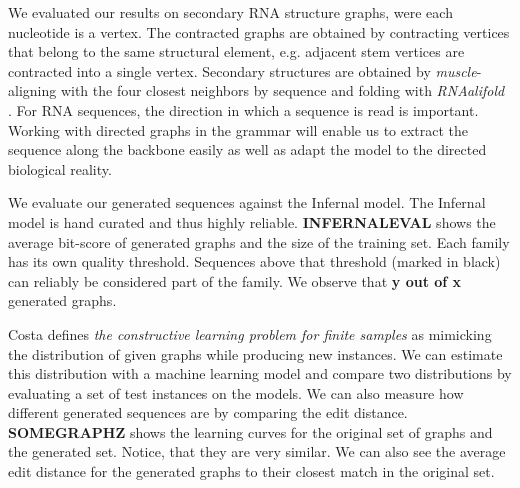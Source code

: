 \documentclass{article}
\begin{document}
We evaluated our results on secondary RNA structure graphs, were each 
nucleotide is a vertex. The contracted graphs are obtained by 
contracting vertices that belong to the same structural element,
e.g. adjacent stem vertices are contracted into a single vertex.
Secondary structures are obtained by \emph{muscle}-aligning \cite{muscle} with 
the four closest neighbors by sequence and folding with \emph{RNAalifold}
\cite{rnaalifold}.  For RNA sequences, the direction in which a sequence
is read is important.  Working with directed graphs in the grammar
will enable us to extract the sequence along the backbone easily as well
as adapt the model to the directed biological reality.

We evaluate our generated sequences against the Infernal model.
The Infernal model is hand curated and thus highly reliable.
 \textbf{INFERNALEVAL} shows the average bit-score of generated graphs
and the size of the training set. Each family has its own quality threshold.
Sequences above that threshold (marked in black) can reliably be considered
part of the family. We observe that \textbf{y out of x} generated graphs.

Costa \cite{costa14} defines \emph{the constructive learning problem for 
finite samples} 
as mimicking the distribution of given graphs while producing new instances.
We can estimate this distribution with a machine learning
model and compare two distributions by evaluating a set of test instances
on the models. We can also measure how different generated sequences
are by comparing the edit distance.
\textbf{SOMEGRAPHZ} shows the learning curves for the original set
of graphs and the generated set. Notice, that they are very similar.
We can also see the average edit distance for the generated graphs 
to their closest match in the original set.
\end{document}
